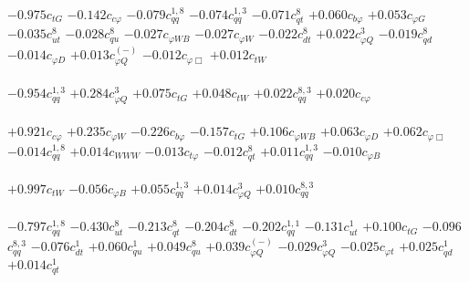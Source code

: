 \documentclass{article}
\begin{document}
{$-0.975$}{\rm $c_{tG}$} 
{$-0.142$}{\rm $c_{c \varphi}$} 
{$-0.079$}{\rm $c_{qq}^{1,8}$} 
{$-0.074$}{\rm $c_{qq}^{1,3}$} 
{$-0.071$}{\rm $c_{qt}^{8}$} 
{$+0.060$}{\rm $c_{b \varphi}$} 
{$+0.053$}{\rm $c_{\varphi G}$} 
{$-0.035$}{\rm $c_{ut}^{8}$} 
{$-0.028$}{\rm $c_{qu}^{8}$} 
{$-0.027$}{\rm $c_{\varphi WB}$} 
{$-0.027$}{\rm $c_{\varphi W}$} 
{$-0.022$}{\rm $c_{dt}^{8}$} 
{$+0.022$}{\rm $c_{\varphi Q}^{3}$} 
{$-0.019$}{\rm $c_{qd}^{8}$} 
{$-0.014$}{\rm $c_{\varphi D}$} 
{$+0.013$}{\rm $c_{\varphi Q}^{(-)}$} 
{$-0.012$}{\rm $c_{\varphi \Box}$} 
{$+0.012$}{\rm $c_{tW}$} 
 \nonumber \\ \nonumber \\ 
{$-0.954$}{\rm $c_{qq}^{1,3}$} 
{$+0.284$}{\rm $c_{\varphi Q}^{3}$} 
{$+0.075$}{\rm $c_{tG}$} 
{$+0.048$}{\rm $c_{tW}$} 
{$+0.022$}{\rm $c_{qq}^{8,3}$} 
{$+0.020$}{\rm $c_{c \varphi}$} 
 \nonumber \\ \nonumber \\ 
{$+0.921$}{\rm $c_{c \varphi}$} 
{$+0.235$}{\rm $c_{\varphi W}$} 
{$-0.226$}{\rm $c_{b \varphi}$} 
{$-0.157$}{\rm $c_{tG}$} 
{$+0.106$}{\rm $c_{\varphi WB}$} 
{$+0.063$}{\rm $c_{\varphi D}$} 
{$+0.062$}{\rm $c_{\varphi \Box}$} 
{$-0.014$}{\rm $c_{qq}^{1,8}$} 
{$+0.014$}{\rm $c_{WWW}$} 
{$-0.013$}{\rm $c_{t \varphi}$} 
{$-0.012$}{\rm $c_{qt}^{8}$} 
{$+0.011$}{\rm $c_{qq}^{1,3}$} 
{$-0.010$}{\rm $c_{\varphi B}$} 
 \nonumber \\ \nonumber \\ 
{$+0.997$}{\rm $c_{tW}$} 
{$-0.056$}{\rm $c_{\varphi B}$} 
{$+0.055$}{\rm $c_{qq}^{1,3}$} 
{$+0.014$}{\rm $c_{\varphi Q}^{3}$} 
{$+0.010$}{\rm $c_{qq}^{8,3}$} 
 \nonumber \\ \nonumber \\ 
{$-0.797$}{\rm $c_{qq}^{1,8}$} 
{$-0.430$}{\rm $c_{ut}^{8}$} 
{$-0.213$}{\rm $c_{qt}^{8}$} 
{$-0.204$}{\rm $c_{dt}^{8}$} 
{$-0.202$}{\rm $c_{qq}^{1,1}$} 
{$-0.131$}{\rm $c_{ut}^{1}$} 
{$+0.100$}{\rm $c_{tG}$} 
{$-0.096$}{\rm $c_{qq}^{8,3}$} 
{$-0.076$}{\rm $c_{dt}^{1}$} 
{$+0.060$}{\rm $c_{qu}^{1}$} 
{$+0.049$}{\rm $c_{qu}^{8}$} 
{$+0.039$}{\rm $c_{\varphi Q}^{(-)}$} 
{$-0.029$}{\rm $c_{\varphi Q}^{3}$} 
{$-0.025$}{\rm $c_{\varphi t}$} 
{$+0.025$}{\rm $c_{qd}^{1}$} 
{$+0.014$}{\rm $c_{qt}^{1}$} 
 \nonumber \\ \nonumber \\ 
\end{document}
